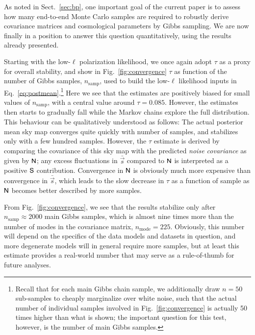 \documentclass[twocolumn]{aa}
\newcommand{\s}[0]{\vec{s}}
\newcommand{\N}[0]{\tens{N}}
\renewcommand{\S}[0]{\tens{S}}
\begin{document}
As noted in Sect.~\ref{sec:bp}, one important goal of the current
paper is to assess how many end-to-end Monte Carlo samples are
required to robustly derive covariance matrices and cosmological
parameters by Gibbs sampling. We are now finally in a position to
answer this question quantitatively, using the results already
presented.

Starting with the low-$\ell$ polarization likelihood, we once again
adopt $\tau$ as a proxy for overall stability, and show in
Fig.~\ref{fig:convergence} $\tau$ as function of the number of Gibbs
samples, $n_{\mathrm{samp}}$, used to build the low-$\ell$ likelihood
inputs in Eq.~\ref{eq:postmean}.\footnote{Recall that for each main
  Gibbs chain sample, we additionally draw $n=50$ sub-samples to
  cheaply marginalize over white noise, such that the actual number of
  individual samples involved in Fig.~\ref{fig:convergence} is
  actually 50 times higher than what is shown; the important question
  for this test, however, is the number of main Gibbs samples.} Here
we see that the estimates are positively biased for small values of
$n_{\mathrm{samp}}$, with a central value around
$\tau=0.085$. However, the estimates then starts to gradually fall
while the Markov chains explore the full distribution. This behaviour
can be qualitatively understood as follows: The actual posterior mean
sky map converges quite quickly with number of samples, and stabilizes
only with a few hundred samples. However, the $\tau$ estimate is
derived by comparing the covariance of this sky map with the predicted
\emph{noise covariance} as given by $\N$; any excess fluctuations in
$\bar{\s}$ compared to $\N$ is interpreted as a positive $\S$
contribution. Convergence in $\N$ is obviously much more expensive 
than convergence in $\bar{\s}$, which leads to the slow decrease in 
$\tau$ as a function of sample as $\N$ becomes better 
described by more samples.

From Fig.~\ref{fig:convergence}, we see that the results stabilize
only after $n_{\mathrm{samp}}\approx 2000$ main Gibbs samples, which
is almost nine times more than the number of modes in the covariance
matrix, $n_{\mathrm{mode}}=225$. Obviously, this number will depend on
the specifics of the data models and datasets in question, and more
degenerate models will in general require more samples, but at least
this estimate provides a real-world number that may serve as a
rule-of-thumb for future analyses.
\end{document}
